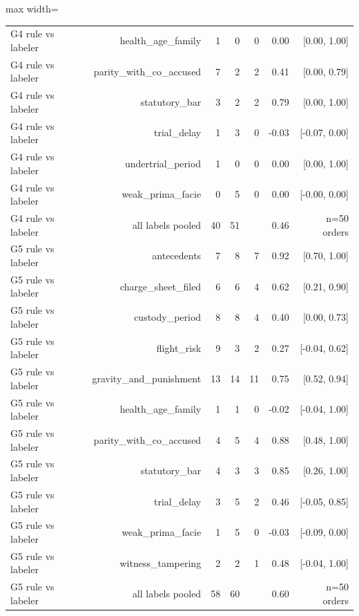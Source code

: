 \begin{table}[t]
\begin{adjustbox}{max width=\textwidth}
\begin{tabular}{lrrrrrr}
G4 rule vs labeler & health\_age\_family & 1 & 0 & 0 & 0.00 & [0.00, 1.00] \\
G4 rule vs labeler & parity\_with\_co\_accused & 7 & 2 & 2 & 0.41 & [0.00, 0.79] \\
G4 rule vs labeler & statutory\_bar & 3 & 2 & 2 & 0.79 & [0.00, 1.00] \\
G4 rule vs labeler & trial\_delay & 1 & 3 & 0 & -0.03 & [-0.07, 0.00] \\
G4 rule vs labeler & undertrial\_period & 1 & 0 & 0 & 0.00 & [0.00, 1.00] \\
G4 rule vs labeler & weak\_prima\_facie & 0 & 5 & 0 & 0.00 & [-0.00, 0.00] \\
G4 rule vs labeler & all labels pooled & 40 & 51 &  & 0.46 & n=50 orders \\
G5 rule vs labeler & antecedents & 7 & 8 & 7 & 0.92 & [0.70, 1.00] \\
G5 rule vs labeler & charge\_sheet\_filed & 6 & 6 & 4 & 0.62 & [0.21, 0.90] \\
G5 rule vs labeler & custody\_period & 8 & 8 & 4 & 0.40 & [0.00, 0.73] \\
G5 rule vs labeler & flight\_risk & 9 & 3 & 2 & 0.27 & [-0.04, 0.62] \\
G5 rule vs labeler & gravity\_and\_punishment & 13 & 14 & 11 & 0.75 & [0.52, 0.94] \\
G5 rule vs labeler & health\_age\_family & 1 & 1 & 0 & -0.02 & [-0.04, 1.00] \\
G5 rule vs labeler & parity\_with\_co\_accused & 4 & 5 & 4 & 0.88 & [0.48, 1.00] \\
G5 rule vs labeler & statutory\_bar & 4 & 3 & 3 & 0.85 & [0.26, 1.00] \\
G5 rule vs labeler & trial\_delay & 3 & 5 & 2 & 0.46 & [-0.05, 0.85] \\
G5 rule vs labeler & weak\_prima\_facie & 1 & 5 & 0 & -0.03 & [-0.09, 0.00] \\
G5 rule vs labeler & witness\_tampering & 2 & 2 & 1 & 0.48 & [-0.04, 1.00] \\
G5 rule vs labeler & all labels pooled & 58 & 60 &  & 0.60 & n=50 orders \\
\bottomrule
\end{tabular}
\end{adjustbox}
\end{table}
